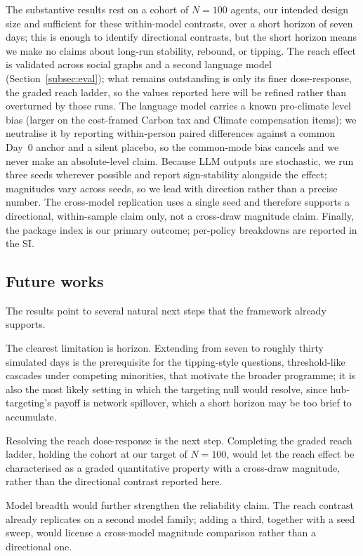 \documentclass[pdflatex,sn-mathphys-num]{sn-jnl}%
\theoremstyle{thmstyleone}%
\theoremstyle{thmstyletwo}%
\theoremstyle{thmstylethree}%
\begin{document}
The substantive results rest on a cohort of $N=100$ agents, our intended design size and
sufficient for these within-model contrasts, over a short horizon of seven days; this is
enough to identify directional contrasts, but the short horizon means we make no claims
about long-run stability, rebound, or tipping. The reach effect is validated across social
graphs and a second language model (Section~\ref{subsec:eval}); what remains outstanding
is only its finer dose-response, the graded reach ladder, so the values reported here
will be refined rather than overturned by those runs. The language model carries a known
pro-climate level bias (larger on the cost-framed Carbon tax and Climate compensation
items); we neutralise it by reporting within-person paired differences against a common
Day~0 anchor and a silent placebo, so the common-mode bias cancels and we never make an
absolute-level claim. Because LLM outputs are stochastic, we run three seeds wherever
possible and report sign-stability alongside the effect; magnitudes vary across seeds, so
we lead with direction rather than a precise number. The cross-model replication uses a
single seed and therefore supports a directional, within-sample claim only, not a
cross-draw magnitude claim. Finally, the package index is our primary outcome; per-policy
breakdowns are reported in the SI.

\subsection{Future works}

The results point to several natural next steps that the framework already supports.

The clearest limitation is horizon. Extending from seven to roughly thirty simulated
days is the prerequisite for the tipping-style questions, threshold-like cascades under
competing minorities, that motivate the broader programme; it is also the most likely
setting in which the targeting null would resolve, since hub-targeting's payoff is
network spillover, which a short horizon may be too brief to accumulate.

Resolving the reach dose-response is the next step. Completing the graded reach ladder,
holding the cohort at our target of $N=100$, would let the reach effect be characterised
as a graded quantitative property with a cross-draw magnitude, rather than the
directional contrast reported here.

Model breadth would further strengthen the reliability claim. The reach contrast already
replicates on a second model family; adding a third, together with a seed sweep, would
license a cross-model magnitude comparison rather than a directional one.
\end{document}
